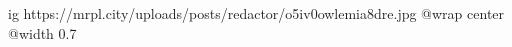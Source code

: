  
 
 
 
 

\ifcmt
  ig https://mrpl.city/uploads/posts/redactor/o5iv0owlemia8dre.jpg
  @wrap center
  @width 0.7
\fi
